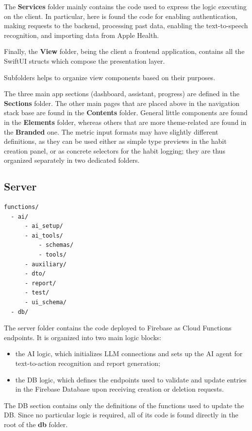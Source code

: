 \documentclass{article}
\newcommand{\newpar}[0]{\vspace{2mm}\noindent}
\begin{document}
\newpar
The \textbf{Services} folder mainly contains the code used to express the logic executing on the client.
In particular, here is found the code for enabling authentication, making requests to the backend, processing past data, enabling the text-to-speech recognition, and importing data from Apple Health.

\newpar
Finally, the \textbf{View} folder, being the client a frontend application, contains all the SwiftUI structs which compose the presentation layer.

Subfolders helps to organize view components based on their purposes.

The three main app sections (dashboard, assistant, progress) are defined in the \textbf{Sections} folder.
The other main pages that are placed above in the navigation stack base are found in the \textbf{Contents} folder.
General little components are found in the \textbf{Elements} folder, whereas others that are more theme-related are found in the \textbf{Branded} one.
The metric input formats may have slightly different definitions, as they can be used either as simple type previews in the habit creation panel, or as concrete selectors for the habit logging; they are thus organized separately in two dedicated folders.

\subsection{Server}

\begin{verbatim}
functions/
  - ai/
      - ai_setup/
      - ai_tools/
          - schemas/
          - tools/
      - auxiliary/
      - dto/
      - report/
      - test/
      - ui_schema/
  - db/
\end{verbatim}

\newpar
The server folder contains the code deployed to Firebase as Cloud Functions endpoints.
It is organized into two main logic blocks:

\begin{itemize}
	\item the AI logic, which initializes LLM connections and sets up the AI agent for text-to-action recognition and report generation;
	\item the DB logic, which defines the endpoints used to validate and update entries in the Firebase Database upon receiving creation or deletion requests.
\end{itemize}

\newpar
The DB section contains only the definitions of the functions used to update the DB.
Since no particular logic is required, all of its code is found directly in the root of the \textbf{db} folder.
\end{document}
